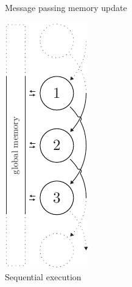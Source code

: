 \begin{figure}[h!]
\begin{minipage}[t]{0.20\textwidth}
    \vfill
    \caption{Message passing memory update}
    \label{fig:memory-update}
  \end{minipage}
  \hfill
  \vrule
  \hfill
  \begin{minipage}[t]{0.20\textwidth}
    \centering
    \includegraphics[page=4, height=2\linewidth]{../resources/invariance.pdf}
    \vfill
    \caption{Sequential execution}
    \label{fig:sequential-execution}
  \end{minipage}
\end{figure}

